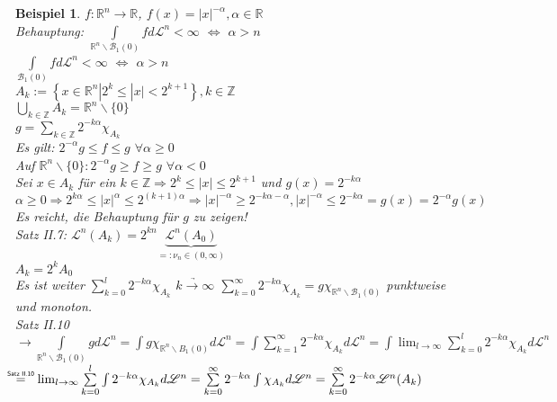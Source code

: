 \documentclass[11pt]{memoir}
\theoremstyle{changebreak}
\newtheorem{Beispiel}{Beispiel}[chapter]
\newcommand\overequal[1]{\mathrel{\overset{\makebox[0pt]{\mbox{\normalfont\tiny\sffamily $ #1 $}}}{=}}}
\begin{document}
\begin{Beispiel}
$f: \mathbb R^n \rightarrow \mathbb R$, $f(x) = |x|^{-\alpha}, \alpha \in \mathbb R$ \\
\emph{Behauptung:} $\int\limits_{\mathbb R^n\backslash \mathscr B_1(0)} f d\mathscr L^n < \infty$ $\Leftrightarrow$ $\alpha > n$ \\
$\int\limits_{\mathscr B_1(0)} f d\mathscr L^n < \infty$ $\Leftrightarrow$ $\alpha > n$ \\
$A_k := \left\{x \in \mathbb R^n | 2^k \leq |x| < 2^{k+1}\right\}, k \in \mathbb Z$ \\
$\bigcup\limits_{k \in \mathbb Z} A_k = \mathbb R^n\backslash\{0\}$ \\
$g = \sum\limits_{k \in \mathbb Z} 2^{-k\alpha}\chi_{A_k}$ \\
Es gilt: $2^{-\alpha}g \leq f \leq g$ $\forall \alpha \geq 0$ \\
Auf $\mathbb R^n\backslash\{0\}: 2^{-\alpha}g \geq f\geq g$ $\forall \alpha < 0$ \\
Sei $x \in A_k$ für ein $k \in \mathbb Z \Rightarrow 2^k \leq |x| \leq 2^{k+1}$ und $g(x) = 2^{-k\alpha}$ \\
$\alpha \geq 0 \Rightarrow 2^{k\alpha} \leq |x|^\alpha \leq 2^{(k+1)\alpha} \Rightarrow |x|^{-\alpha} \geq 2^{-k\alpha - \alpha}, |x|^{-\alpha} \leq 2^{-k\alpha} = g(x) = 2^{-\alpha} g(x)$ \\
Es reicht, die Behauptung für $g$ zu zeigen! \\
Satz II.7: $\mathscr L^n(A_k) = 2^{kn}\underbrace{\mathscr L^n(A_0)}_{=: \nu_n \in (0, \infty)}$ \\
$A_k = 2^k A_0$ \\
Es ist weiter $\sum\limits_{k=0}^l 2^{-k\alpha}\chi_{A_k}$ $\underrightarrow{k \rightarrow \infty}$ $\sum\limits_{k=0}^\infty 2^{-k\alpha}\chi_{A_k} = g\chi_{\mathbb R^n \backslash \mathscr B_1(0)}$ punktweise und monoton. \\
Satz II.10 \\
$\rightarrow \int\limits_{\mathbb R^n\backslash \mathscr B_1(0)} g d\mathscr L^n = \int g\chi_{\mathbb R^n\backslash B_1(0)} d\mathscr L^n = \int \sum\limits_{k=1}^\infty 2^{-k\alpha}\chi_{A_k} d\mathscr L^n = \int \lim_{l \rightarrow \infty} \sum\limits_{k=0}^l 2^{-k\alpha} \chi_{A_k} d\mathscr L^n$
$\overequal{\text{Satz II.10}} \, \, \, \, \lim_{l \rightarrow \infty} \sum\limits_{k=0}^l \int 2^{-k\alpha}\chi_{A_k} d\mathscr L^n = \sum\limits_{k=0}^\infty 2^{-k\alpha} \int \chi_{A_k} d\mathscr L^n = \sum\limits_{k=0}^\infty 2^{-k\alpha} \mathscr L^n (A_k)$ \\

\end{Beispiel}
\end{document}

